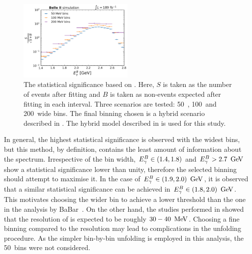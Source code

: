 \begin{figure}[htbp!]
    \centering
    \includegraphics[width=0.5\textwidth]{figures/fitting/binning_significance.pdf}
    \caption{\label{fig:binning_significance}
    The statistical significance based on .
    Here, $S$ is taken as the number of \BtoXsgamma events after fitting and $B$ is taken as non-\BtoXsgamma events expected after fitting in each \EB interval.
    Three scenarios are tested: 50~\mev, 100~\mev and 200~\mev wide bins.
    The final binning chosen is a hybrid scenario described in .
    The hybrid model described in  is used for this study.
    }    
\end{figure}

In general, the highest statistical significance is observed with the widest bins, but this method, by definition, contains the least amount of information about the spectrum.
Irrespective of the bin width,  ${E^B_{\gamma}}\in(1.4,1.8)$ and ${E^B_{\gamma}}>2.7~\mathrm{\,Ge\kern -0.1em V}$ show a statistical significance lower than unity, therefore the selected binning should attempt to maximise it.
In the case of ${E^B_{\gamma}}\in(1.9,2.0)~\mathrm{\,Ge\kern -0.1em V}$, it is observed that a similar statistical significance can be achieved in ${E^B_{\gamma}}\in(1.8,2.0)~\mathrm{\,Ge\kern -0.1em V}$.
This motivates choosing the wider bin to achieve a lower threshold than the one in the analysis by BaBar~\cite{BaBar:2007yhb}.
On the other hand, the studies performed in  showed that the resolution of \EB is expected to be roughly $30-40~\mathrm{\,Me\kern -0.1em V}$.
Choosing a fine binning \EB compared to the resolution may lead to complications in the unfolding procedure.
As the simpler bin-by-bin unfolding is employed in this analysis, the 50~\mev bins were not considered.

